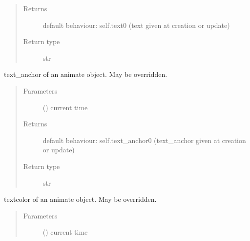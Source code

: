 \documentclass[letterpaper,10pt,english]{sphinxmanual}
\begin{document}
\begin{fulllineitems}
\begin{fulllineitems}
\begin{quote}
\begin{description}
\item[{Returns}] \leavevmode
{} \textendash{} default behaviour: self.text0 (text given at creation or update)

\item[{Return type}] \leavevmode
str

\end{description}\end{quote}

\end{fulllineitems}


\begin{fulllineitems}
\label{\detokenize{Reference:salabim.Animate.text_anchor}}
text\_anchor of an animate object. May be overridden.
\begin{quote}\begin{description}
\item[{Parameters}] \leavevmode
{} () \textendash{} current time

\item[{Returns}] \leavevmode
{} \textendash{} default behaviour: self.text\_anchor0 (text\_anchor given at creation or update)

\item[{Return type}] \leavevmode
str

\end{description}\end{quote}

\end{fulllineitems}


\begin{fulllineitems}
\label{\detokenize{Reference:salabim.Animate.textcolor}}
textcolor of an animate object. May be overridden.
\begin{quote}\begin{description}
\item[{Parameters}] \leavevmode
{} () \textendash{} current time


\end{description}
\end{quote}
\end{fulllineitems}
\end{fulllineitems}
\end{document}
